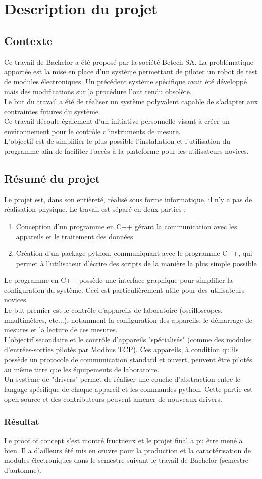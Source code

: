 \documentclass[AdvProjMgmt_Sebastien_Deriaz]{subfiles}
\begin{document}
\section{Description du projet}
\subsection{Contexte}
Ce travail de Bachelor a été proposé par la société Betech SA. La problématique apportée est la mise en place d'un système permettant de piloter un robot de test de modules électroniques. Un précédent système spécifique avait été développé mais des modifications sur la procédure l'ont rendu obsolète.\\
Le but du travail a été de réaliser un système polyvalent capable de s'adapter aux contraintes futures du système.\\
Ce travail découle également d'un initiative personnelle visant à créer un environnement pour le contrôle d'instruments de mesure.\\
L'objectif est de simplifier le plus possible l'installation et l'utilisation du programme afin de faciliter l'accès à la plateforme pour les utilisateurs novices.
\subsection{Résumé du projet}
Le projet est, dans son entièreté, réalisé sous forme informatique, il n'y a pas de réalisation physique. Le travail est séparé en deux parties :
\begin{enumerate}
\item Conception d'un programme en C++ gérant la communication avec les appareils et le traitement des données
\item Création d'un package python, communiquant avec le programme C++, qui permet à l'utilisateur d'écrire des scripts de la manière la plus simple possible
\end{enumerate}
Le programme en C++ possède une interface graphique pour simplifier la configuration du système. Ceci est particulièrement utile pour des utilisateurs novices.\\
Le but premier est le contrôle d'appareils de laboratoire (oscilloscopes, mnultimètres, etc...), notamment la configuration des appareils, le démarrage de mesures et la lecture de ces mesures.\\
L'objectif secondaire et le contrôle d'appareils "spécialisés" (comme des modules d'entrées-sorties pilotés par Modbus TCP). Ces appareils, à condition qu'ils possède un protocole de communication standard et ouvert, peuvent être pilotés au même titre que les équipements de laboratoire.\\
Un système de "drivers" permet de réaliser une couche d'abstraction entre le langage spécifique de chaque appareil et les commandes python. Cette partie est open-source et des contributeurs peuvent amener de nouveaux drivers.\\
\subsubsection{Résultat}
Le proof of concept s'est montré fructueux et le projet final a pu être mené a bien. Il a d'ailleurs été mis en œuvre pour la production et la caractérisation de modules électroniques dans le semestre suivant le travail de Bachelor (semestre d'automne).
\end{document}
